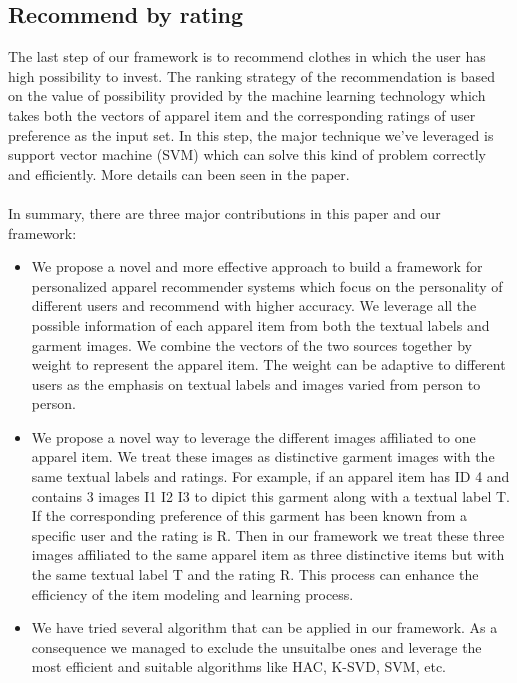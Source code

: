 \subsection{Recommend by rating}
The last step of our framework is to recommend clothes in which the user has high possibility to invest. The ranking strategy of the recommendation is based on the value of possibility provided by the machine learning technology which takes both the vectors of apparel item and the corresponding ratings of user preference as the input set. In this step, the major technique we've leveraged is support vector machine (SVM) which can solve this kind of problem correctly and efficiently. More details can been seen in the paper.\\
\\
In summary, there are three major contributions in this paper and our framework:
\begin{itemize}
	\item We propose a novel and more effective approach to build a framework for personalized apparel recommender systems which focus on the personality of different users and recommend with higher accuracy. We leverage all the possible information of each apparel item from both the textual labels and garment images. We combine the vectors of the two sources together by weight to represent the apparel item. The weight can be adaptive to different users as the emphasis on textual labels and images varied from person to person.
	\item We propose a novel way to leverage the different images affiliated to one apparel item. We treat these images as distinctive garment images with the same textual labels and ratings. For example, if an apparel item has ID 4 and contains 3 images I1 I2 I3 to dipict this garment along with a textual label T. If the corresponding preference of this garment has been known from a specific user and the rating is R. Then in our framework we treat these three images affiliated to the same
        apparel item as three distinctive items but with the same textual label T and the rating R. This process can enhance the efficiency of the item modeling and learning process.
	\item We have tried several algorithm that can be applied in our framework. As a consequence we managed to exclude the unsuitalbe ones and leverage the most efficient and suitable algorithms like HAC, K-SVD, SVM, etc.
\end{itemize}

